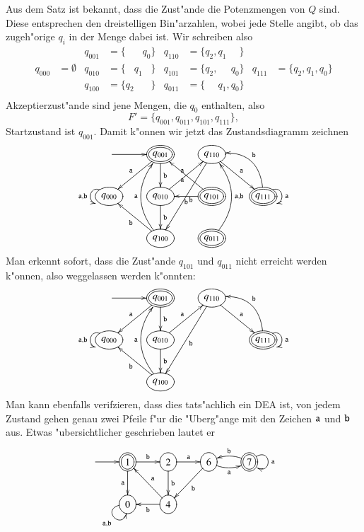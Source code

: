 Aus dem Satz ist bekannt, dass die Zust"ande die Potenzmengen von $Q$
sind. Diese entsprechen den dreistelligen Bin"arzahlen, wobei jede
Stelle angibt, ob das zugeh"orige $q_i$ in der Menge dabei ist. Wir
schreiben also
\begin{align*}
       &          &q_{001}&=\{\phantom{q_2q_1}q_0\}&q_{110}&=\{q_2,q_1\phantom{,q_0}\}&&\\
q_{000}&=\emptyset&q_{010}&=\{\phantom{q_2}q_1\phantom{q_0}\}&q_{101}&=\{q_2,\phantom{q_1,}q_0\}&q_{111}&=\{q_2,q_1,q_0\}\\
       &          &q_{100}&=\{q_2\phantom{q_1q_0}\}&q_{011}&=\{\phantom{q_2,}q_1,q_0\}&&\\
\end{align*}
Akzeptierzust"ande sind jene Mengen, die $q_0$ enthalten, also
\[
F'=\{ q_{001}, q_{011}, q_{101}, q_{111}\},
\]
Startzustand ist $q_{001}$.
Damit k"onnen wir jetzt das Zustandsdiagramm zeichnen
\[
\entrymodifiers={++[o][F]}
\xymatrix{
*+\txt{}\ar[r]
	&*++[o][F=]{q_{001}} \ar[d]^{\tt b}\ar[dl]_{\tt a}
		&{q_{110}}\ar[dr]^{\tt a} \ar[ddl]^{\tt b}
\\
{q_{000}}\ar@(ul,dl)_{{\tt a},{\tt b}}
	&{q_{010}} \ar[ur]^{\tt a} \ar[d]^{\tt b}
		&*++[o][F=]{q_{101}} \ar[ul]^{\tt a} \ar[l]^{\tt b}
			&*++[o][F=]{q_{111}}\ar@(ur,dr)^{{\tt a}} \ar@/_20pt/[ul]_{\tt b}
\\
*+\txt{}
	&{q_{100}}\ar@/^20pt/[uu]^{\tt a}  \ar[ul]^{\tt b}
		&*++[o][F=]{q_{011}} \ar@/_20pt/[uu]_{{\tt a},{\tt b}}
}
\]
Man erkennt sofort, dass die Zust"ande $q_{101}$ und $q_{011}$
nicht erreicht werden k"onnen, also weggelassen werden k"onnten:
\begin{equation}
\entrymodifiers={++[o][F]}
\xymatrix{
*+\txt{}\ar[r]
	&*++[o][F=]{q_{001}} \ar[d]^{\tt b}\ar[dl]_{\tt a}
		&{q_{110}}\ar[dr]^{\tt a} \ar[ddl]^{\tt b}
\\
{q_{000}}\ar@(ul,dl)_{{\tt a},{\tt b}}
	&{q_{010}} \ar[ur]^{\tt a} \ar[d]^{\tt b}
		&*+\txt{}
			&*++[o][F=]{q_{111}}\ar@(ur,dr)^{{\tt a}} \ar@/_20pt/[ul]_{\tt b}
\\
*+\txt{}
	&{q_{100}}\ar@/^20pt/[uu]^{\tt a}  \ar[ul]^{\tt b}
		&*+\txt{}
}
\label{nea-eps}
\end{equation}
Man kann ebenfalls verifzieren, dass dies tats"achlich ein DEA ist, 
von jedem Zustand gehen genau zwei Pfeile f"ur die "Uberg"ange mit
den Zeichen ${\tt a}$ und ${\tt b}$ aus. Etwas "ubersichtlicher
geschrieben lautet er
\[
\entrymodifiers={++[o][F]}
\xymatrix{
*+\txt{}\ar[r]
	&*++[o][F=]{1}\ar[r]^{\tt b} \ar[d]_{\tt a}
		&2 \ar[r]^{\tt a} \ar[d]^{\tt b}
			&6\ar@/_/[r]_{\tt a} \ar[dl]^{\tt b}
				&*++[o][F=]{7}\ar@/_/[l]_{\tt b} \ar@(ur,dr)^{\tt a}
\\
*+\txt{}
	&0 \ar@(l,d)_{{\tt a},{\tt b}}
		&4 \ar[ul]_{\tt a} \ar[l]^{\tt b}
}
\]

